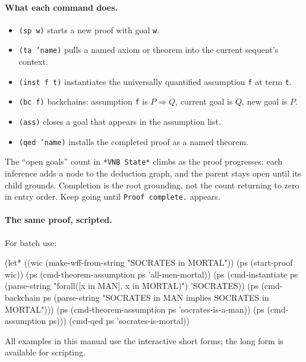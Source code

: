 \paragraph{What each command does.}
\begin{sloppypar}
\begin{itemize}
\item \texttt{(sp w)} starts a new proof with goal \texttt{w}.
\item \texttt{(ta 'name)} pulls a named axiom or theorem into the
  current sequent's context.
\item \texttt{(inst f t)} instantiates the universally quantified
  assumption \texttt{f} at term \texttt{t}.
\item \texttt{(bc f)} backchains: assumption \texttt{f} is $P
  \Rightarrow Q$, current goal is $Q$, new goal is $P$.
\item \texttt{(ass)} closes a goal that appears in the assumption
  list.
\item \texttt{(qed 'name)} installs the completed proof as a named
  theorem.
\end{itemize}
\end{sloppypar}

\begin{remark}
The ``open goals'' count in \texttt{*VNB State*} climbs as the proof
progresses: each inference adds a node to the deduction graph, and
the parent stays open until its child grounds.  Completion is the
root grounding, not the count returning to zero in entry order.
Keep going until \texttt{Proof complete.} appears.
\end{remark}

\paragraph{The same proof, scripted.}
For batch use:
\begin{VNBsnip}
(let* ((wic (make-wff-from-string "SOCRATES in MORTAL"))
       (ps  (start-proof wic))
       (ps  (cmd-theorem-assumption ps 'all-men-mortal))
       (ps  (cmd-instantiate ps
              (parse-string "forall([x in MAN], x in MORTAL)")
              'SOCRATES))
       (ps  (cmd-backchain ps
              (parse-string
                "SOCRATES in MAN implies SOCRATES in MORTAL")))
       (ps  (cmd-theorem-assumption ps 'socrates-is-a-man))
       (ps  (cmd-assumption ps)))
  (cmd-qed ps 'socrates-is-mortal))
\end{VNBsnip}
All examples in this manual use the interactive short forms; the long
form is available for scripting.

